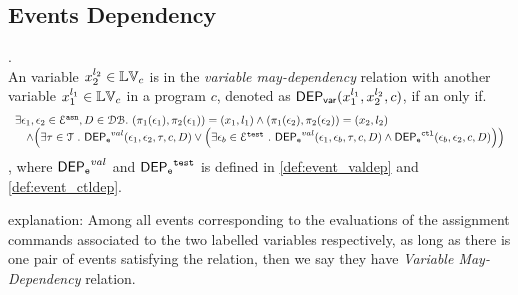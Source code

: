 %
%
%
\subsection{Events Dependency}
%
\begin{defn}.
  \label{def:var_dep}
  \\
  An variable ${x}_2^{l_2} \in \mathbb{LV}_{{c}}$ is in the \emph{variable may-dependency} relation with another
  variable ${x}_1^{l_1} \in \mathbb{LV}_{{c}}$ in a program ${c}$, denoted as 
  $\mathsf{DEP_{var}}({x}_1^{l_1}, {x}_2^{l_2}, {c})$, if an only if.
  \[
    \begin{array}{l}
  \exists \event_1, \event_2 \in \eventset^{\asn}, D \in \dbdom. ~
  (\pi_{1}{(\event_1)}, \pi_{2}{(\event_1)}) = ({x}_1, l_1)
  \land
  (\pi_{1}{(\event_2)}, \pi_{2}{(\event_2)}) = ({x}_2, l_2)
  \\ \quad 
  \land 
 \left(
  \exists \trace \in \mathcal{T} \st 
  \eventdep^{val}(\event_1, \event_2, \trace, c, D) 
  \lor
  \left( \exists \event_b \in \eventset^{\test} \st \eventdep^{val}(\event_1, \event_b, \trace, c, D) \land \eventdep^{\ctl}(\event_b, \event_2, c, D)  \right)  
 \right)
    \end{array}
  \]
  , where $\mathsf{DEP_{\mathtt{e}}}^{val}$ and $\mathsf{DEP_{\mathtt{e}}}^{\mathtt{{test}}}$ is defined in \ref{def:event_valdep} and \ref{def:event_ctldep}.
  \end{defn}
  explanation: Among all events corresponding to the evaluations of the assignment commands associated to the two labelled variables respectively, 
as long as there is one pair of events satisfying the relation, then we say they have \emph{Variable May-Dependency} relation.
